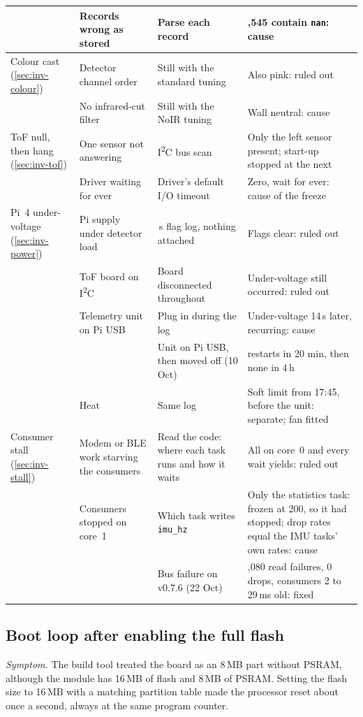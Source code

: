 {\begin{longtable}{|>{\raggedright\arraybackslash}p{2.1cm}|>{\raggedright\arraybackslash}p{3.6cm}|>{\raggedright\arraybackslash}p{4.3cm}|>{\raggedright\arraybackslash}p{3.7cm}|}
 & Records wrong as stored & Parse each record & 5,545 contain \texttt{nan}: cause \\ \hline
Colour cast (\ref{sec:inv-colour}) & Detector channel order & Still with the standard tuning & Also pink: ruled out \\ \cline{2-4}
 & No infrared-cut filter & Still with the NoIR tuning & Wall neutral: cause \\ \hline
ToF null, then hang (\ref{sec:inv-tof}) & One sensor not answering & I\textsuperscript{2}C bus scan & Only the left sensor present; start-up stopped at the next \\ \cline{2-4}
 & Driver waiting for ever & Driver's default I/O timeout & Zero, wait for ever: cause of the freeze \\ \hline
Pi~4 under-voltage (\ref{sec:inv-power}) & Pi supply under detector load & 2\,s flag log, nothing attached & Flags clear: ruled out \\ \cline{2-4}
 & ToF board on I\textsuperscript{2}C & Board disconnected throughout & Under-voltage still occurred: ruled out \\ \cline{2-4}
 & Telemetry unit on Pi USB & Plug in during the log & Under-voltage 14\,s later, recurring: cause \\ \cline{2-4}
 & & Unit on Pi USB, then moved off (10 Oct) & 3 restarts in 20 min, then none in 4\,h \\ \cline{2-4}
 & Heat & Same log & Soft limit from 17:45, before the unit: separate; fan fitted \\ \hline
Consumer stall (\ref{sec:inv-stall}) & Modem or BLE work starving the consumers & Read the code: where each task runs and how it waits & All on core~0 and every wait yields: ruled out \\ \cline{2-4}
 & Consumers stopped on core~1 & Which task writes \texttt{imu\_hz} & Only the statistics task: frozen at 200, so it had stopped; drop rates equal the IMU tasks' own rates: cause \\ \cline{2-4}
 & & Bus failure on v0.7.6 (22 Oct) & 17,080 read failures, 0 drops, consumers 2 to 29\,ms old: fixed \\ \hline
\end{longtable}
}

\subsection{Boot loop after enabling the full flash}
\label{sec:inv-flash}

\emph{Symptom.} The build tool treated the board as an 8\,MB part without PSRAM, although the module has 16\,MB of flash and 8\,MB of PSRAM. Setting the flash size to 16\,MB with a matching partition table made the processor reset about once a second, always at the same program counter.


